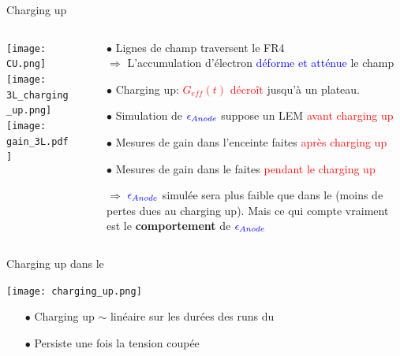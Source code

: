    \begin{frame}{Charging up}
    	\begin{scriptsize}
    		\begin{columns}
    			\begin{column}{0.5\textwidth}
    				\texttt{[image: CU.png]}\\
                    \vspace{0.1cm}
    				\texttt{[image: 3L\_charging\_up.png]}\\
    				\texttt{[image: gain\_3L.pdf]}
    			\end{column}\hfill
    			\begin{column}{0.5\textwidth}
    				\begin{itemize}
    					\item[$\bullet$] Lignes de champ traversent le FR4\\
    					$\Rightarrow$ L'accumulation d'électron \textcolor{blue}{déforme et atténue} le champ
    					\item[$\bullet$] Charging up: \textcolor{red}{$G_{eff}(t)$ décroît} jusqu'à un plateau.
    				\end{itemize}
    				\vspace{0.3cm}
    				\begin{itemize}
    					\item[$\bullet$] Simulation de $\textcolor{blue}{\epsilon_{Anode}}$ suppose un LEM \textcolor{red}{avant charging up}
    					\item[$\bullet$] Mesures de gain dans l'enceinte faites \textcolor{red}{après charging up}
    					\item[$\bullet$] Mesures de gain dans le \TOO{} faites \textcolor{red}{pendant le charging up}
    					\item[$\Rightarrow$] $\textcolor{blue}{\epsilon_{Anode}}$ simulée sera plus faible que dans le \TOO{} (moins de pertes dues au charging up). Mais ce qui compte vraiment est le \textbf{comportement} de $\textcolor{blue}{\epsilon_{Anode}}$
    				\end{itemize}
    			\end{column}
    		\end{columns}
    	\end{scriptsize}
    \end{frame}

   \begin{frame}{Charging up dans le \TOO{}}
        \begin{scriptsize}
            \texttt{[image: charging\_up.png]}
            \begin{itemize}
                \item[$\bullet$] Charging up $\sim$ linéaire sur les durées des runs du \TOO{}
                \item[$\bullet$] Persiste une fois la tension coupée
            \end{itemize}
        \end{scriptsize}
    \end{frame}

